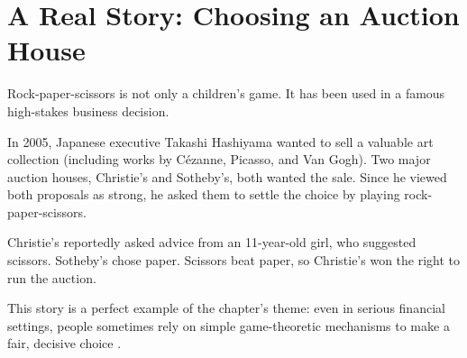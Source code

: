 \section{A Real Story: Choosing an Auction House}
Rock-paper-scissors is not only a children's game. It has been used in a famous
high-stakes business decision.

In 2005, Japanese executive Takashi Hashiyama wanted to sell a valuable art
collection (including works by C\'ezanne, Picasso, and Van Gogh). Two major
auction houses, Christie's and Sotheby's, both wanted the sale. Since he viewed
both proposals as strong, he asked them to settle the choice by playing
rock-paper-scissors.

Christie's reportedly asked advice from an 11-year-old girl, who suggested
scissors. Sotheby's chose paper. Scissors beat paper, so Christie's won the
right to run the auction.

This story is a perfect example of the chapter's theme: even in serious
financial settings, people sometimes rely on simple game-theoretic mechanisms
to make a fair, decisive choice \cite{wiki:rock-paper-scissors}.
